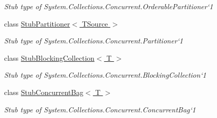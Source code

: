 \begin{DoxyCompactItemize}
\begin{DoxyCompactList}\small\item\em Stub type of System.\-Collections.\-Concurrent.\-Orderable\-Partitioner`1\end{DoxyCompactList}\item 
class \hyperlink{class_system_1_1_collections_1_1_concurrent_1_1_fakes_1_1_stub_partitioner_3_01_t_source_01_4}{Stub\-Partitioner$<$ T\-Source $>$}
\begin{DoxyCompactList}\small\item\em Stub type of System.\-Collections.\-Concurrent.\-Partitioner`1\end{DoxyCompactList}\item 
class \hyperlink{class_system_1_1_collections_1_1_concurrent_1_1_fakes_1_1_stub_blocking_collection_3_01_t_01_4}{Stub\-Blocking\-Collection$<$ T $>$}
\begin{DoxyCompactList}\small\item\em Stub type of System.\-Collections.\-Concurrent.\-Blocking\-Collection`1\end{DoxyCompactList}\item 
class \hyperlink{class_system_1_1_collections_1_1_concurrent_1_1_fakes_1_1_stub_concurrent_bag_3_01_t_01_4}{Stub\-Concurrent\-Bag$<$ T $>$}
\begin{DoxyCompactList}\small\item\em Stub type of System.\-Collections.\-Concurrent.\-Concurrent\-Bag`1\end{DoxyCompactList}\end{DoxyCompactItemize}
